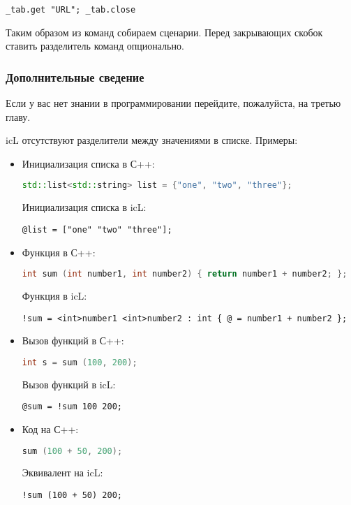\documentclass[a4paper, 14pt]{extarticle}
\newenvironment{icItems}
	{ \begin{itemize} [noitemsep,nolistsep] }
	{ \end{itemize} }
\begin{document}
\begin{lstlisting}[numbers=none]
_tab.get "URL"; _tab.close
\end{lstlisting}

Таким образом из команд собираем сценарии. Перед закрывающих скобок ставить разделитель команд опционально.

\subsubsection{Дополнительные сведение}

Если у вас нет знании в программировании перейдите, пожалуйста, на третью главу.

icL отсутствуют разделители между значениями в списке. Примеры:

\begin{icItems}
	\item Инициализация списка в С++:
\begin{lstlisting}[numbers=none, language=C++]
std::list<std::string> list = {"one", "two", "three"};
\end{lstlisting}
	Инициализация списка в icL:
\begin{lstlisting}[numbers=none]
@list = ["one" "two" "three"];
\end{lstlisting}
	\item Функция в С++:
\begin{lstlisting}[numbers=none, language=C++]
int sum (int number1, int number2) { return number1 + number2; };
\end{lstlisting}
	Функция в icL:
\begin{lstlisting}[numbers=none]
!sum = <int>number1 <int>number2 : int { @ = number1 + number2 };
\end{lstlisting}
	\item Вызов функций в С++:
\begin{lstlisting}[numbers=none, language=C++]
int s = sum (100, 200);
\end{lstlisting}
	Вызов функций в icL:
\begin{lstlisting}[numbers=none]
@sum = !sum 100 200;
\end{lstlisting}
	\item Код на С++:
\begin{lstlisting}[numbers=none, language=C++]
sum (100 + 50, 200);
\end{lstlisting}
	Эквивалент на icL:
\begin{lstlisting}[numbers=none]
!sum (100 + 50) 200;
\end{lstlisting}
\end{icItems}
\end{document}
